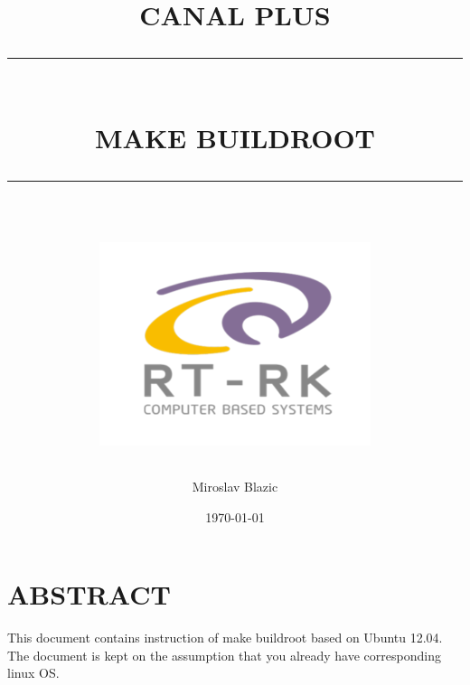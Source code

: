 \documentclass[12pt]{report}
\begin{document}
\newcommand{\HRule}[1]{\rule{\linewidth}{#1}}
\onehalfspacing


\pagestyle{fancy}
\fancyhf{}
\setlength\headheight{15pt}


\title{ \normalsize \textsc{CANAL PLUS}
\\ [1.0cm]
\HRule{0.5pt} \\
\LARGE \textbf{\uppercase{MAKE BUILDROOT}}
\HRule{2pt} \\ [0.5cm]
\normalsize  \vspace*{5\baselineskip}
\includegraphics[scale=0.8]{logo_rtrk.png}
}



\author{Miroslav Blazic}
\date{\today\\
}

\maketitle


\newpage
\tableofcontents
\newpage



\section*{ABSTRACT}
This document contains instruction of make buildroot based on Ubuntu 12.04. \newline
The document is kept on the assumption that you already have corresponding linux OS.
\end{document}

